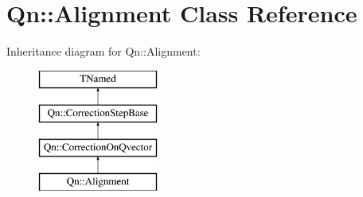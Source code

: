 \hypertarget{classQn_1_1Alignment}{}\section{Qn\+:\+:Alignment Class Reference}
\label{classQn_1_1Alignment}
Inheritance diagram for Qn\+:\+:Alignment\+:\begin{figure}[H]
\begin{center}
\leavevmode
\includegraphics[height=4.000000cm]{classQn_1_1Alignment}
\end{center}
\end{figure}
